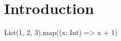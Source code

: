 \section{Introduction}

\begin{lstlisting-nobreak}
List(1, 2, 3).map((x: Int) => x + 1)
\end{lstlisting-nobreak}